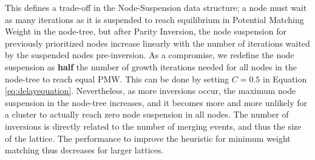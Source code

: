 This defines a trade-off in the Node-Suspension data structure; a node must wait as many iterations as it is suspended to reach equilibrium in Potential Matching Weight in the node-tree, but after Parity Inversion, the node suspension for previously prioritized nodes increase linearly with the number of iterations waited by the suspended nodes pre-inversion. As a compromise, we redefine the node suspension as \textbf{half} the number of growth iterations needed for all nodes in the node-tree to reach equal PMW. This can be done by setting $C=0.5$ in Equation \eqref{eq:delayequation}. Nevertheless, as more inversions occur, the maximum node suspension in the node-tree increases, and it becomes more and more unlikely for a cluster to actually reach zero node suspension in all nodes. The number of inversions is directly related to the number of merging events, and thus the size of the lattice. The performance to improve the heuristic for minimum weight matching thus decreases for larger lattices. 

